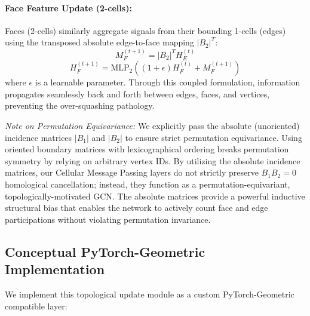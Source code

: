 \documentclass[11pt, letterpaper]{article}
\begin{document}
\paragraph{Face Feature Update (2-cells):}
Faces (2-cells) similarly aggregate signals from their bounding 1-cells (edges) using the transposed absolute edge-to-face mapping $|B_2|^T$:
\begin{equation}
    M_F^{(t+1)} = |B_2|^T H_E^{(t)}
\end{equation}
\begin{equation}
    H_F^{(t+1)} = \text{MLP}_2\left( (1 + \epsilon) H_F^{(t)} + M_F^{(t+1)} \right)
\end{equation}
where $\epsilon$ is a learnable parameter. Through this coupled formulation, information propagates seamlessly back and forth between edges, faces, and vertices, preventing the over-squashing pathology.

\emph{Note on Permutation Equivariance:} We explicitly pass the absolute (unoriented) incidence matrices $|B_1|$ and $|B_2|$ to ensure strict permutation equivariance. Using oriented boundary matrices with lexicographical ordering breaks permutation symmetry by relying on arbitrary vertex IDs. By utilizing the absolute incidence matrices, our Cellular Message Passing layers do not strictly preserve $B_1 B_2 = 0$ homological cancellation; instead, they function as a permutation-equivariant, topologically-motivated GCN. The absolute matrices provide a powerful inductive structural bias that enables the network to actively count face and edge participations without violating permutation invariance.

\subsection{Conceptual PyTorch-Geometric Implementation}
We implement this topological update module as a custom PyTorch-Geometric compatible layer:
\end{document}
